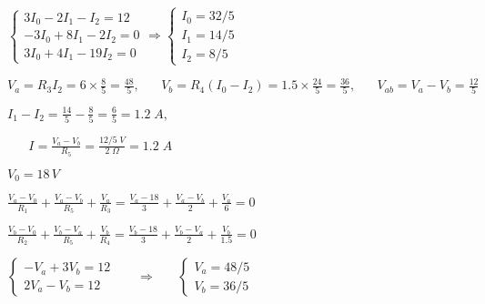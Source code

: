 \documentclass{article}
\def\lthtmlcheckvsize{\ifdim\ht\sizebox<\vsize 
  \ifdim\wd\sizebox<\hsize\expandafter\hfill\fi \expandafter\vfill
  \else\expandafter\vss\fi}%
\begin{document}
{\newpage\clearpage
{}%
$\displaystyle \left\{\begin{array}{l}
3I_0-2I_1-I_2=12\\-3I_0+8I_1-2I_2=0\\3I_0+4I_1-19I_2=0\end{array}\right.
\Longrightarrow
\left\{\begin{array}{l}
I_0=32/5\\I_1=14/5\\I_2=8/5
\end{array}\right.$%
\lthtmlindisplaymathZ
\lthtmlcheckvsize\clearpage}

{\newpage\clearpage
{}%
$\displaystyle V_a=R_3I_2=6\times \frac{8}{5}=\frac{48}{5},\;\;\;\;\;\;
V_b=R_4(I_0-I_2)=1.5\times \frac{24}{5}=\frac{36}{5},\;\;\;\;\;\;
V_{ab}=V_a-V_b=\frac{12}{5}$%
\lthtmlindisplaymathZ
\lthtmlcheckvsize\clearpage}

{\newpage\clearpage
{}%
$\displaystyle I_1-I_2=\frac{14}{5}-\frac{8}{5}=\frac{6}{5}=1.2\;A,
\;\;\;\;\;\;\;$%
\lthtmlindisplaymathZ
\lthtmlcheckvsize\clearpage}

{\newpage\clearpage
{}%
$\displaystyle \;\;\;\;\;\;
I=\frac{V_a-V_b}{R_5}=\frac{12/5\;V}{2\;\Omega}=1.2\;A$%
\lthtmlindisplaymathZ
\lthtmlcheckvsize\clearpage}

{\newpage\clearpage
{}%
$ V_0=18\,V$%
\lthtmlindisplaymathZ
\lthtmlcheckvsize\clearpage}

{\newpage\clearpage
{}%
$\displaystyle \frac{V_a-V_0}{R_1}+\frac{V_a-V_b}{R_5}+\frac{V_a}{R_3}
=\frac{V_a-18}{3}+\frac{V_a-V_b}{2}+\frac{V_a}{6}=0$%
\lthtmlindisplaymathZ
\lthtmlcheckvsize\clearpage}

{\newpage\clearpage
{}%
$\displaystyle \frac{V_b-V_0}{R_2}+\frac{V_b-V_a}{R_5}+\frac{V_b}{R_4}
=\frac{V_b-18}{3}+\frac{V_b-V_a}{2}+\frac{V_b}{1.5}=0$%
\lthtmlindisplaymathZ
\lthtmlcheckvsize\clearpage}

{\newpage\clearpage
{}%
$\displaystyle \left\{ \begin{array}{ll}-V_a+3V_b=12\\2V_a-V_b=12\end{array}\right.
\;\;\;\;\;\;\Longrightarrow\;\;\;\;\;\;
\left\{ \begin{array}{ll}V_a=48/5\\V_b=36/5\end{array}\right.$%
\lthtmlindisplaymathZ
\lthtmlcheckvsize\clearpage}
\end{document}

